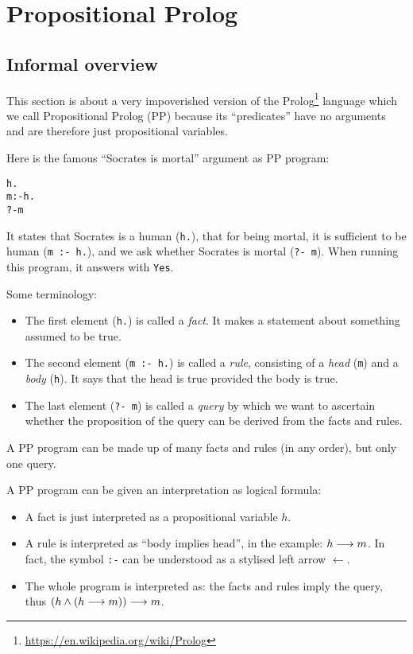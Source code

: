 \documentclass[english]{article}
\begin{document}
\section{Propositional Prolog}\label{sec:prolog}

\subsection{Informal overview}\label{sec:prolog_overview}

This section is about a very impoverished version of the
Prolog\footnote{\url{https://en.wikipedia.org/wiki/Prolog}} language which we
call Propositional Prolog (PP) because its ``predicates'' have no arguments and are
therefore just propositional variables.

Here is the famous ``Socrates is mortal'' argument as PP program:
\begin{alltt}
  h.
  m :- h.
  ?- m
\end{alltt}
It states that Socrates is a human (\texttt{h.}), that for being mortal, it is
sufficient to be human (\texttt{m :- h.}), and we ask whether Socrates is
mortal (\texttt{?- m}). When running this program, it answers with
\texttt{Yes}.

Some terminology:
\begin{itemize}
\item The first element (\texttt{h.}) is called a \emph{fact}. It makes a
  statement about something assumed to be true.
\item The second element (\texttt{m :- h.}) is called a \emph{rule},
  consisting of a \emph{head} (\texttt{m}) and a \emph{body} (\texttt{h}). It
  says that the head is true provided the body is true.
\item The last element (\texttt{?- m}) is called a \emph{query} by which we
  want to ascertain whether the proposition of the query can be derived from
  the facts and rules.
\end{itemize}
A PP program can be made up of many facts and rules (in any order), but only
one query.

A PP program can be given an interpretation as logical formula:
\begin{itemize}
\item A fact is just interpreted as a propositional variable $h$.
\item A rule is interpreted as ``body implies head'', in the example: $h \longrightarrow
  m$. In fact, the symbol \texttt{:-} can be understood as a stylised left
  arrow $\longleftarrow$.
\item The whole program is interpreted as: the facts and rules imply the
  query, thus $(h \land (h \longrightarrow m)) \longrightarrow m$.
\end{itemize}
\end{document}
